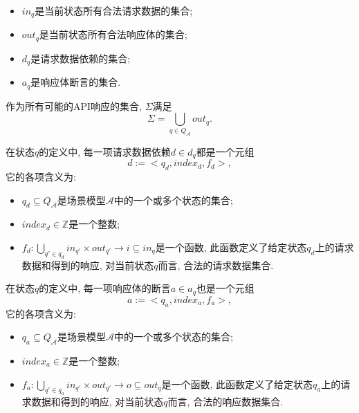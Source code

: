 \begin{definition}
\begin{itemize}
                    \item $in_q$是当前状态所有合法请求数据的集合;
                    
                    \item $out_q$是当前状态所有合法响应体的集合;
                    
                    \item $d_q$是请求数据依赖的集合;
                    
                    \item $a_q$是响应体断言的集合.
                \end{itemize}
                
                作为所有可能的API响应的集合, $\Sigma$满足
                \begin{equation}
                    \Sigma = \bigcup_{q \in Q_{\mathcal{A}}} out_q.
                \end{equation}
                
                在状态$q$的定义中, 每一项请求数据依赖$d \in d_q$都是一个元组
                \begin{equation}
                    d := <q_d, index_d, f_d>,
                \end{equation}
                它的各项含义为:
                \begin{itemize}
                    \item $q_d \subseteq Q_{\mathcal{A}}$是场景模型$\mathcal{A}$中的一个或多个状态的集合;
                    
                    \item $index_d \in \mathbb{Z}$是一个整数;
                    
                    \item $f_d: \bigcup_{q' \in q_d} in_{q'} \times out_{q'} \to i \subseteq in_q$是一个函数, 此函数定义了给定状态$q_d$上的请求数据和得到的响应, 对当前状态$q$而言, 合法的请求数据集合.
                \end{itemize}
                
                在状态$q$的定义中, 每一项响应体的断言$a \in a_q$也是一个元组
                \begin{equation}
                    a := <q_a, index_a, f_a>,
                \end{equation}
                它的各项含义为:
                \begin{itemize}
                    \item $q_a \subseteq Q_{\mathcal{A}}$是场景模型$\mathcal{A}$中的一个或多个状态的集合;
                    
                    \item $index_a \in \mathbb{Z}$是一个整数;
                    
                    \item $f_a: \bigcup_{q' \in q_a} in_{q'} \times out_{q'} \to o \subseteq out_q$是一个函数, 此函数定义了给定状态$q_a$上的请求数据和得到的响应, 对当前状态$q$而言, 合法的响应数据集合.
                \end{itemize}
            \end{definition}
            
